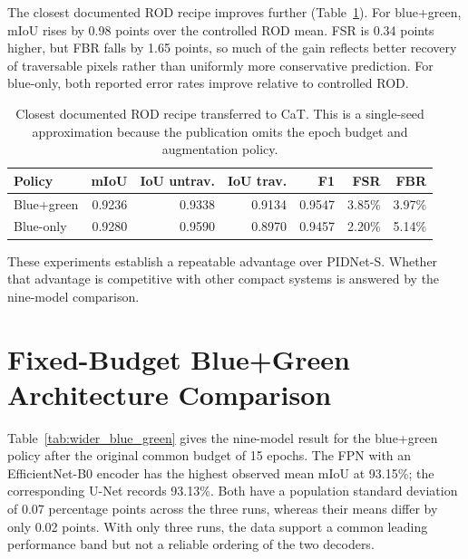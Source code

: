 The closest documented ROD recipe improves further
(Table~\ref{tab:rod_paper_results}). For blue+green, mIoU rises by 0.98 points
over the controlled ROD mean. FSR is 0.34 points higher, but FBR falls by 1.65
points, so much of the gain reflects better recovery of traversable pixels
rather than uniformly more conservative prediction. For blue-only, both
reported error rates improve relative to controlled ROD.

\begin{table}[H]
\centering
\caption{Closest documented ROD recipe transferred to CaT. This is a
single-seed approximation because the publication omits the epoch budget and
augmentation policy.}
\label{tab:rod_paper_results}
\small
\begin{tabular}{@{}lrrrrrr@{}}
\toprule
\textbf{Policy} & \textbf{mIoU} & \textbf{IoU untrav.} & \textbf{IoU trav.} & \textbf{F1} & \textbf{FSR} & \textbf{FBR} \\
\midrule
Blue+green & 0.9236 & 0.9338 & 0.9134 & 0.9547 & 3.85\% & 3.97\% \\
Blue-only & 0.9280 & 0.9590 & 0.8970 & 0.9457 & 2.20\% & 5.14\% \\
\bottomrule
\end{tabular}
\end{table}

These experiments establish a repeatable advantage over PIDNet-S. Whether that
advantage is competitive with other compact systems is answered by the
nine-model comparison.

\section{Fixed-Budget Blue+Green Architecture Comparison}

Table~\ref{tab:wider_blue_green} gives the nine-model result for the
blue+green policy after the original common budget of 15 epochs. The FPN with
an EfficientNet-B0 encoder has the highest
observed mean mIoU at 93.15\%; the corresponding U-Net records 93.13\%.
Both have a population standard deviation of 0.07 percentage points across
the three runs, whereas their means differ by only 0.02 points. With only
three runs, the data support a common leading performance band but not a
reliable ordering of the two decoders.

